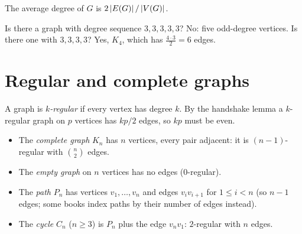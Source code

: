 \begin{corollary}
The average degree of $G$ is $2\left\lvert E(G) \right\rvert/\left\lvert V(G) \right\rvert$.
\end{corollary}

\begin{example}
Is there a graph with degree sequence $3,3,3,3,3$? No: five odd-degree vertices. Is there one
with $3,3,3,3$? Yes, $K_4$, which has $\frac{4\cdot3}{2} = 6$ edges.
\end{example}

\section{Regular and complete graphs}

\begin{definition}[Regular]
A graph is \emph{$k$-regular} if every vertex has degree $k$. By the handshake lemma a
$k$-regular graph on $p$ vertices has $kp/2$ edges, so $kp$ must be even.
\end{definition}

\begin{definition}
\begin{itemize}
  \item The \emph{complete graph} $K_n$ has $n$ vertices, every pair adjacent: it is
        $(n-1)$-regular with $\binom{n}{2}$ edges.
  \item The \emph{empty graph} on $n$ vertices has no edges ($0$-regular).
  \item The \emph{path} $P_n$ has vertices $v_1,\dots,v_n$ and edges $v_iv_{i+1}$ for $1\le i<n$
        (so $n-1$ edges; some books index paths by their number of edges instead).
  \item The \emph{cycle} $C_n$ ($n \ge 3$) is $P_n$ plus the edge $v_nv_1$: $2$-regular with $n$ edges.
\end{itemize}
\end{definition}

\begin{center}
\end{center}

